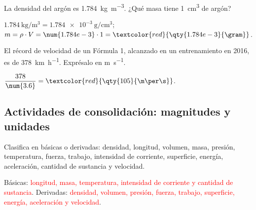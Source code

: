 \begin{exercise}
    La densidad del argón es \qty{1.784}{\kg\per\cubic\m}. ¿Qué masa tiene \qty{1}{\cubic\cm} de argón?
    \begin{solu}
        \(\num{1.784}~\unit{\kg\per\cubic\m} = \num{1.784e-3}~\unit{\gram\per\cubic\cm}\); \(m = \rho \cdot V = \num{1.784e-3} \cdot 1 = \textcolor{red}{\qty{1.784e-3}{\gram}}\).
    \end{solu}
\end{exercise}

\begin{exercise}
    El récord de velocidad de un Fórmula 1, alcanzado en un entrenamiento en 2016, es de \qty{378}{\km\per\hour}. Exprésalo en \unit{\m\per\s}.
    \begin{solu}
        \(\dfrac{378}{\num{3.6}} = \textcolor{red}{\qty{105}{\m\per\s}}\).
    \end{solu}
\end{exercise}

\subsection*{Actividades de consolidación: magnitudes y unidades}

\begin{exercise}
    Clasifica en básicas o derivadas: densidad, longitud, volumen, masa, presión, temperatura, fuerza, trabajo, intensidad de corriente, superficie, energía, aceleración, cantidad de sustancia y velocidad.
    \begin{solu}
        Básicas: \textcolor{red}{longitud, masa, temperatura, intensidad de corriente y cantidad de sustancia}. Derivadas: \textcolor{red}{densidad, volumen, presión, fuerza, trabajo, superficie, energía, aceleración y velocidad}.
    \end{solu}
\end{exercise}

